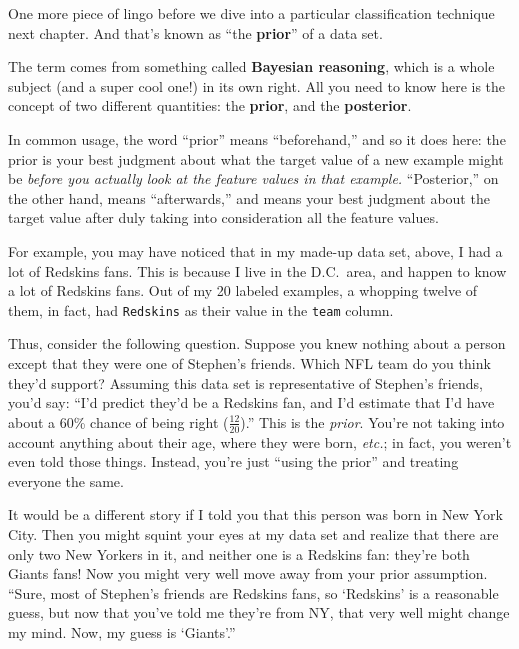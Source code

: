 \label{prior}

One more piece of lingo before we dive into a particular classification
technique next chapter. And that's known as ``the \textbf{prior}'' of a data
set.


The term comes from something called \textbf{Bayesian reasoning}, which is a
whole subject (and a super cool one!) in its own right. All you need to know
here is the concept of two different quantities: the \textbf{prior}, and the
\textbf{posterior}.

In common usage, the word ``prior'' means ``beforehand,'' and so it does here:
the prior is your best judgment about what the target value of a new example
might be \textit{before you actually look at the feature values in that
example.} ``Posterior,'' on the other hand, means ``afterwards,'' and means
your best judgment about the target value after duly taking into consideration
all the feature values.

For example, you may have noticed that in my made-up data set, above, I had a
lot of Redskins fans. This is because I live in the D.C.~area, and happen to
know a lot of Redskins fans. Out of my 20 labeled examples, a whopping twelve
of them, in fact, had \texttt{Redskins} as their value in the \texttt{team}
column.

Thus, consider the following question. Suppose you knew nothing about a person
except that they were one of Stephen's friends. Which NFL team do you think
they'd support? Assuming this data set is representative of Stephen's friends,
you'd say: ``I'd predict they'd be a Redskins fan, and I'd estimate that I'd
have about a 60\% chance of being right ($\frac{12}{20}$).'' This is the
\textit{prior}. You're not taking into account anything about their age, where
they were born, \textit{etc.}; in fact, you weren't even told those things.
Instead, you're just ``using the prior'' and treating everyone the same.

It would be a different story if I told you that this person was born in New
York City. Then you might squint your eyes at my data set and realize that
there are only two New Yorkers in it, and neither one is a Redskins fan:
they're both Giants fans! Now you might very well move away from your prior
assumption. ``Sure, most of Stephen's friends are Redskins fans, so `Redskins'
is a reasonable guess, but now that you've told me they're from NY, that very
well might change my mind. Now, my guess is `Giants'.''

